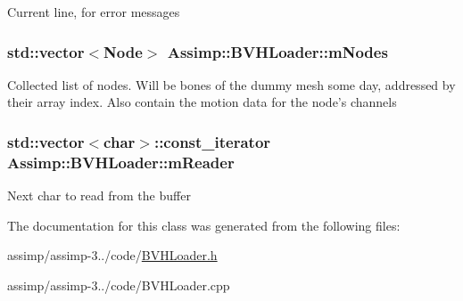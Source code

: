 Current line, for error messages \hypertarget{class_assimp_1_1_b_v_h_loader_aece4b9ced38cd7ca8151dcd6ee7fc65a}{
\subsubsection[{m\+Nodes}]{\setlength{\rightskip}{0pt plus 5cm}std\+::vector$<${\bf Node}$>$ Assimp\+::\+B\+V\+H\+Loader\+::m\+Nodes\hspace{0.3cm}{\ttfamily [protected]}}}\label{class_assimp_1_1_b_v_h_loader_aece4b9ced38cd7ca8151dcd6ee7fc65a}
Collected list of nodes. Will be bones of the dummy mesh some day, addressed by their array index. Also contain the motion data for the node's channels \hypertarget{class_assimp_1_1_b_v_h_loader_ad7afa3ab368969bfd40f033456599713}{
\subsubsection[{m\+Reader}]{\setlength{\rightskip}{0pt plus 5cm}std\+::vector$<$char$>$\+::const\+\_\+iterator Assimp\+::\+B\+V\+H\+Loader\+::m\+Reader\hspace{0.3cm}{\ttfamily [protected]}}}\label{class_assimp_1_1_b_v_h_loader_ad7afa3ab368969bfd40f033456599713}
Next char to read from the buffer 

The documentation for this class was generated from the following files\+:\begin{DoxyCompactItemize}
\item 
assimp/assimp-\/3../code/\hyperlink{_b_v_h_loader_8h}{B\+V\+H\+Loader.\+h}\item 
assimp/assimp-\/3../code/B\+V\+H\+Loader.\+cpp\end{DoxyCompactItemize}
